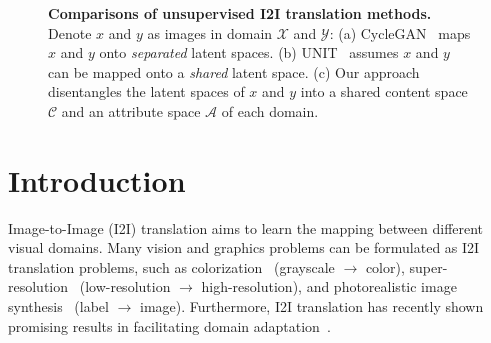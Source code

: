 \documentclass[runningheads]{llncs}
\renewcommand{\jiabin}[1]{}
\begin{document}
\begin{figure}[t]
	\hfill	
	\begin{minipage}{0.31\textwidth}
    \end{minipage}
    \caption{ 
    \textbf{Comparisons of unsupervised I2I translation methods.}
    Denote $x$ and $y$ as images in domain $\mathcal{X}$ and $\mathcal{Y}$: 
    (a) CycleGAN~\cite{zhu2017cyclegan} maps $x$ and $y$ onto \emph{separated} latent spaces.
    (b) UNIT~\cite{liu2017unit} assumes $x$ and $y$ can be mapped onto a  \emph{shared} latent space.
    (c) Our approach disentangles the latent spaces of $x$ and $y$ into a shared content space $\mathcal{C}$ and an attribute space $\mathcal{A}$ of each domain.
    }
    \vspace{\figmargin}
    \label{figure:assumption}
\end{figure}

\vspace{\secmargin}
\section{Introduction}
\label{sec:introduction}
\vspace{\secmargin}
Image-to-Image (I2I) translation aims to learn the mapping between different visual domains. 
%
Many vision and graphics problems can be formulated as I2I translation problems, such as colorization~\cite{larsson2016colorization,zhang2016colorization2} (grayscale $\rightarrow$ color), super-resolution~\cite{ledig2016photo,lai2017deep,li2016deep} (low-resolution $\rightarrow$ high-resolution), and photorealistic image synthesis~\cite{chen2017photographic,wang2017pix2pixhd} (label $\rightarrow$ image).
%
Furthermore, I2I translation has recently shown promising results in facilitating domain adaptation~\cite{bousmalis2017unsupervisedda,shrivastava2017apple,hoffman2017cycada,murez2018image}.
\end{document}
